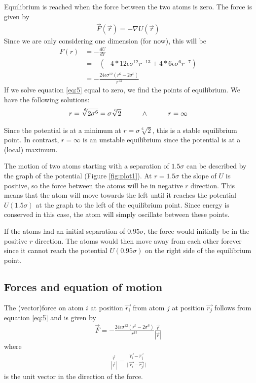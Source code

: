 \documentclass[a4paper,10pt,english]{article}
\begin{document}
\newpage
Equilibrium is reached when the force between the two atoms is zero. The force is given by
\begin{align}
    \Vec{F}(\Vec{r}) = - \nabla U(\Vec{r})
\end{align}
Since we are only considering one dimension (for now), this will be
\begin{align}
    F(r) &= - \frac{dU}{dr} \\
    &= -(-4*12\epsilon\sigma^{12}r^{-13} + 4*6\epsilon\sigma^{6}r^{-7}) \\
    &= -\frac{24\epsilon\sigma^{12}(r^6-2\sigma^6)}{r^{13}} \label{eq:5}
\end{align}
If we solve equation \ref{eq:5} equal to zero, we find the points of equilibrium. We have the following solutions:
\begin{align*}
    r 
    = \sqrt[\leftroot{-2}\uproot{2}6]{2\sigma^6} 
    = \sigma \sqrt[\leftroot{-2}\uproot{2}6]{2} 
    \hspace{1cm} \land \hspace{1cm}
    r
    =\infty
\end{align*}

Since the potential is at a minimum at $ r = \sigma \sqrt[6]{2} $, this is a stable equilibrium point. In contrast, $ r = \infty $ is an unstable equilibrium since the potential is at a (local) maximum.

The motion of two atoms starting with a separation of $1.5\sigma$ can be described by the graph of the potential (Figure \ref{fig:plot1}). At $r=1.5\sigma$ the slope of $U$ is positive, so the force between the atoms will be in negative $r$ direction. This means that the atom will move towards the left until it reaches the potential $U(1.5\sigma)$ at the graph to the left of the equilibrium point.  Since energy is conserved in this case, the atom will simply oscillate between these points.

If the atoms had an initial separation of $0.95\sigma$, the force would initially be in the positive $r$ direction. The atoms would then move away from each other forever since it cannot reach the potential $U(0.95\sigma)$ on the right side of the equilibrium point.

\subsection{Forces and equation of motion} \label{1b}

The (vector)force on atom $i$ at position $\Vec{r_i}$ from atom $j$ at position $\Vec{r_j}$ follows from equation \ref{eq:5} and is given by
\begin{align} \label{eq:6}
    \Vec{F}
    = - \frac{24\epsilon\sigma^{12}(r^6-2\sigma^6)}{r^{13}} \frac{\Vec{r}}{|\Vec{r}|}
\end{align} 
where 
\begin{align*}
    \frac{\Vec{r}}{|\Vec{r}|} = \frac{\Vec{r_i} - \Vec{r_j}}{||\Vec{r_i} - \Vec{r_j}||}
\end{align*}
is the unit vector in the direction of the force. 
\end{document}
